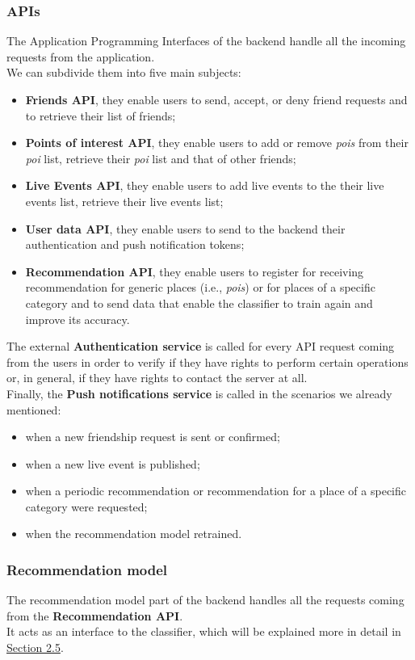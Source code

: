 \documentclass[../../main]{subfiles}
\begin{document}
\subsubsection{APIs}
\label{sss:apis}
The Application Programming Interfaces of the backend handle all the incoming requests from the application.\\
We can subdivide them into five main subjects:
\begin{itemize}
    \item \textbf{Friends API}, they enable users to send, accept, or deny friend requests and to retrieve their list of friends;
    \item \textbf{Points of interest API}, they enable users to add or remove \textit{pois} from their \textit{poi} list, retrieve their \textit{poi} list and that of other friends;
    \item \textbf{Live Events API}, they enable users to add live events to the their live events list, retrieve their live events list;
    \item \textbf{User data API}, they enable users to send to the backend their authentication and push notification tokens;
    \item \textbf{Recommendation API}, they enable users to register for receiving recommendation for generic places (i.e., \textit{pois}) or for places of a specific category and to send data that enable the classifier to train again and improve its accuracy.
\end{itemize}
The external \textbf{Authentication service} is called for every API request coming from the users in order to verify if they have rights to perform certain operations or, in general, if they have rights to contact the server at all.\\
Finally, the \textbf{Push notifications service} is called in the scenarios we already mentioned:
\begin{itemize}
    \item when a new friendship request is sent or confirmed;
    \item when a new live event is published;
    \item when a periodic recommendation or recommendation for a place of a specific category were requested;
    \item when the recommendation model retrained.
\end{itemize}

\subsubsection{Recommendation model}
\label{sss:recommendation-model-design}
The recommendation model part of the backend handles all the requests coming from the \textbf{Recommendation API}.\\
It acts as an interface to the classifier, which will be explained more in detail in \hyperref[ss:recommendation-model]{Section 2.5}.
\end{document}

